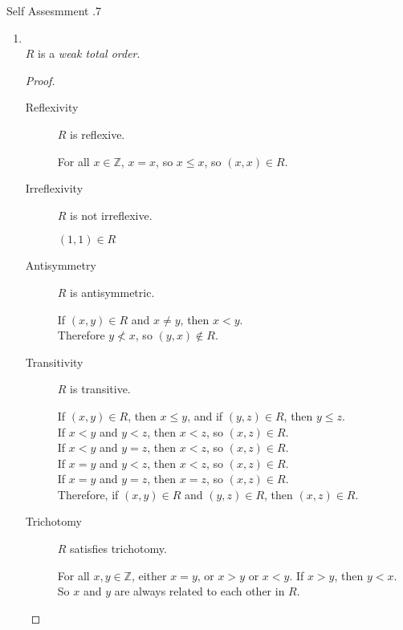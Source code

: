 \documentclass[../notes.tex]{subfiles}
\begin{document}
\begin{exercise}{Self Assesmment \thechapter.7}
\begin{enumerate}
						\item {}\\
							$R$ is a \emph{weak total order}.
							\begin{proof}
								$ $
								\begin{description}
									\item[Reflexivity] $R$ is reflexive.
										\begin{subproof}
											For all $x \in \mathbb{Z}$, $x = x$, so $x \leq x$, so $(x, x) \in R$.
										\end{subproof}
									\item[Irreflexivity] $R$ is not irreflexive.
										\begin{subproof}[Counterexample]
											$(1, 1) \in R$
										\end{subproof}
									\item[Antisymmetry] $R$ is antisymmetric.
										\begin{subproof}
											If $(x, y) \in R$ and $x \neq y$, then $x < y$.\\
											Therefore $y \not < x$, so $(y, x) \notin R$.
										\end{subproof}
									\item[Transitivity] $R$ is transitive.
										\begin{subproof}
											If $(x, y) \in R$, then $x \leq y$, and
											if $(y, z) \in R$, then $y \leq z$.\\
											If $x < y$ and $y < z$, then $x < z$, so $(x, z) \in R$.\\
											If $x < y$ and $y = z$, then $x < z$, so $(x, z) \in R$.\\
											If $x = y$ and $y < z$, then $x < z$, so $(x, z) \in R$.\\
											If $x = y$ and $y = z$, then $x = z$, so $(x, z) \in R$.\\
											Therefore, if $(x, y) \in R$ and $(y, z) \in R$, then $(x, z) \in R$. 
										\end{subproof}
									\item[Trichotomy] $R$ satisfies trichotomy.
										\begin{subproof}
											For all $x, y \in \mathbb{Z}$, either $x = y$, or $x > y$ or $x < y$. If $x > y$, then $y < x$. So $x$ and $y$ are always related to each other in $R$.
										\end{subproof}
								\end{description}

\end{proof}
\end{enumerate}
\end{exercise}
\end{document}
